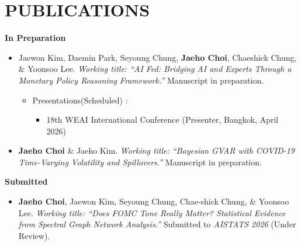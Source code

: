 \documentclass[a4paper,9pt]{extarticle}
\begin{document}
\section*{PUBLICATIONS}
\noindent 
\textbf{In Preparation}
\begin{itemize}
  \item Jaewon Kim, Daemin Park, Seyoung Chung, \textbf{Jaeho Choi}, Chaeshick Chung, \& Yoonsoo Lee.
  \textit{Working title: “AI Fed: Bridging AI and Experts Through a Monetary Policy Reasoning Framework.”}
  Manuscript in preparation.
  \begin{itemize}
    \item Presentations(Scheduled) :\\
        \begin{itemize}
            \item 18th WEAI International Conference (Presenter, Bangkok, April 2026)
        \end{itemize}
    \end{itemize}
  \item \textbf{Jaeho Choi} \& Jaeho Kim.
  \textit{Working title: “Bayesian GVAR with COVID-19 Time-Varying Volatility and Spillovers.”}
  Manuscript in preparation.
\end{itemize}

\noindent 
\textbf{Submitted}
\begin{itemize}
  \item \textbf{Jaeho Choi}, Jaewon Kim, Seyoung Chung, Chae-shick Chung, \& Yoonsoo Lee.
  \textit{Working title: “Does FOMC Tone Really Matter? Statistical Evidence from Spectral Graph Network Analysis.”}
  Submitted to \textit{AISTATS 2026} (Under Review).
\end{itemize}
\end{document}
